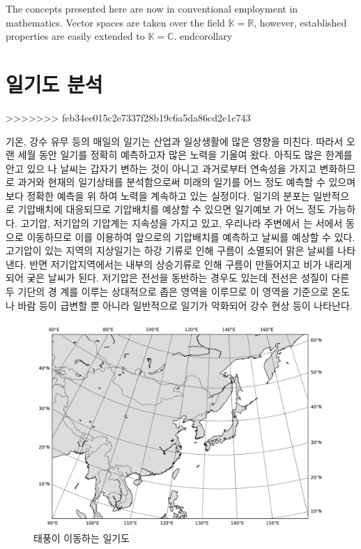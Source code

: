 \begin{corollary}
	The concepts presented here are now in conventional employment in mathematics. Vector spaces are taken over the field $\mathbb{K}=\mathbb{R}$, however, established properties are easily extended to $\mathbb{K}=\mathbb{C}$.
	end{corollary}
	
	
	\section{일기도 분석}
>>>>>>> feb34ee015c2e7337f28b19c6a5da86cd2e1c743
	
	기온, 강수 유무 등의 매일의 일기는 산업과 일상생활에 많은 영향을 미친다. 따라서 오랜
	세월 동안 일기를 정확히 예측하고자 많은 노력을 기울여 왔다. 아직도 많은 한계를 안고 있으
	나 날씨는 갑자기 변하는 것이 아니고 과거로부터 연속성을 가지고 변화하므로 과거와 현재의
	일기상태를 분석함으로써 미래의 일기를 어느 정도 예측할 수 있으며 보다 정확한 예측을 위
	하여 노력을 계속하고 있는 실정이다.
	일기의 분포는 일반적으로 기압배치에 대응되므로 기압배치를 예상할 수 있으면 일기예보
	가 어느 정도 가능하다. 고기압, 저기압의 기압계는 지속성을 가지고 있고, 우리나라 주변에서
	는 서에서 동으로 이동하므로 이를 이용하여 앞으로의 기압배치를 예측하고 날씨를 예상할 수
	있다. 고기압이 있는 지역의 지상일기는 하강 기류로 인해 구름이 소멸되어 맑은 날씨를 나타
	낸다. 반면 저기압지역에서는 내부의 상승기류로 인해 구름이 만들어지고 비가 내리게 되어
	궂은 날씨가 된다. 저기압은 전선을 동반하는 경우도 있는데 전선은 성질이 다른 두 기단의 경
	계를 이루는 상대적으로 좁은 영역을 이루므로 이 영역을 기준으로 온도나 바람 등이 급변할
	뿐 아니라 일반적으로 일기가 악화되어 강수 현상 등이 나타난다.
	
	\begin{figure}
		\centering
		\includegraphics[width=0.8\linewidth]{Pictures/weathermap01}
		\caption{태풍이 이동하는 일기도}
		\label{fig:weathermap01}
	\end{figure}
	

\end{corollary}
